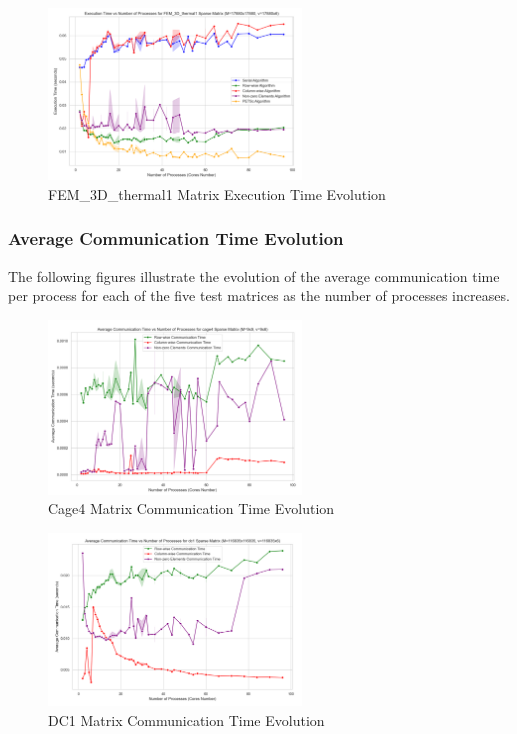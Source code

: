 \documentclass[12pt,oneside]{book} %
\begin{document}
\begin{figure}[H]
    \centering
    \includegraphics[width=0.6\textwidth]{../results/matrix_dim/FEM_3D_thermal1_k6_execution_time.png}
    \caption{FEM\_3D\_thermal1 Matrix Execution Time Evolution}\label{fig:fem-3d-thermal1-k6-execution-time}
\end{figure}

\subsubsection{Average Communication Time Evolution}
The following figures illustrate the evolution of the average communication
time per process for each of the five test matrices as the number of processes
increases.

\begin{figure}[H]
    \centering
    \includegraphics[width=0.6\textwidth]{../results/matrix_dim/cage4_k6_communication_time.png}
    \caption{Cage4 Matrix Communication Time Evolution}\label{fig:cage4-k6-communication-time}
\end{figure}

\begin{figure}[H]
    \centering
    \includegraphics[width=0.6\textwidth]{../results/matrix_dim/dc1_k6_communication_time.png}
    \caption{DC1 Matrix Communication Time Evolution}\label{fig:dc1-k6-communication-time}
\end{figure}
\end{document}

